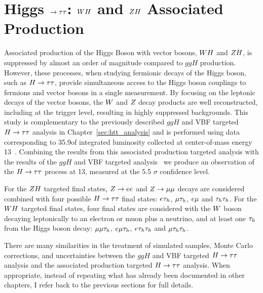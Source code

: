 \chapter{Higgs $\to \tau\tau$: $WH$ and $ZH$ Associated Production}
\label{sec:vh_analysis}

Associated production of the Higgs Boson with vector bosons, $WH$ and $ZH$,
is suppressed by almost an order of magnitude compared to $ggH$ production. However, 
these processes, when studying fermionic decays of the Higgs boson, such as $H\to\tau\tau$, 
provide simultaneous access to the Higgs boson couplings to fermions and vector bosons
in a single measurement. By focusing on the leptonic decays of the vector bosons,
the $W$ and $Z$ decay products are well reconstructed, including at the trigger level, resulting
in highly suppressed backgrounds.
This study is complementary to the previously described $ggH$ and VBF targeted
$H\to\tau\tau$ analysis in Chapter~\ref{sec:htt_analysis} and is performed 
using data corresponding to 35.9\fbinv of integrated luminosity 
collected at center-of-mass energy 13\TeV~\cite{HIG-18-007}. Combining
the results from this associated production targeted analysis with the results 
of the $ggH$ and VBF targeted analysis~\cite{cms_13TeV_htt_jhep_2017}
we produce an observation of the $H\to\tau\tau$ process at 13\TeV, 
measured at the 5.5 $\sigma$ confidence level. 

For the $ZH$ targeted final states, $Z\rightarrow ee$
and $Z \to \mu\mu$ decays are considered combined with four possible $H\to\tau\tau$ 
final states: $e\tau_{h}$, $\mu\tau_{h}$,
$e\mu$ and $\tau_{h}\tau_{h}$. For the $WH$ targeted final states, four final states are considered with
the $W$ boson decaying leptonically to an electron or muon plus a neutrino, 
and at least one $\tau_{h}$ from the Higgs boson decay:
$\mu\mu\tau_{h}$, $e\mu\tau_{h}$, $e\tau_{h}\tau_{h}$ and $\mu\tau_{h}\tau_{h}$. 

There are many similarities in the treatment of simulated samples, Monte Carlo
corrections, and uncertainties between the $ggH$ and VBF targeted $H\to\tau\tau$ analysis
and the associated production targeted $H\to\tau\tau$ analysis. When appropriate, instead of repeating
what has already been documented in other chapters, I refer back to the previous sections for
full details.



